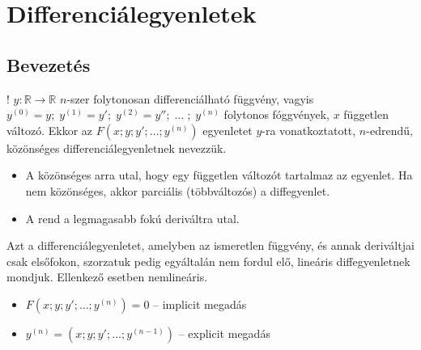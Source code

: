 \documentclass[main.tex]{subfiles}
\begin{document}
\section{Differenciálegyenletek}

\subsection{Bevezetés}


! $y : \mathbb{R} \rightarrow \mathbb{R}$ $n$-szer
folytonosan differenciálható függvény, vagyis
$y^{(0)} = y;\; y^{(1)} = y';\; y^{(2)} = y'';\; \dots \; ;\;  y^{(n)}$
folytonos fóggvények, $x$ független változó. Ekkor az
$F \left( x ; y ; y' ; \dots ; y^{(n)} \right)$
egyenletet $y$-ra vonatkoztatott, $n$-edrendű,
közönséges differenciálegyenletnek nevezzük.



\begin{itemize}
  \item A közönséges arra utal, hogy egy
        független változót tartalmaz az egyenlet.
        Ha nem közönséges, akkor parciális
        (többváltozós) a diffegyenlet.

  \item A rend a legmagasabb fokú deriváltra utal.
\end{itemize}







Azt a differenciálegyenletet, amelyben az ismeretlen
függvény, és annak deriváltjai csak elsőfokon,
szorzatuk pedig egyáltalán nem fordul elő,
lineáris diffegyenletnek mondjuk. Ellenkező
esetben nemlineáris.




\begin{itemize}
  \item $F \left( x ; y ; y' ; \dots ; y^{(n)} \right) = 0$
        \tabto{4.9cm} – \tabto{5.5cm} implicit megadás

  \item $y^{(n)} = \left( x ; y ; y' ; \dots ; y^{(n-1)} \right)$
        \tabto{4.9cm} – \tabto{5.5cm} explicit megadás
\end{itemize}
\end{document}
